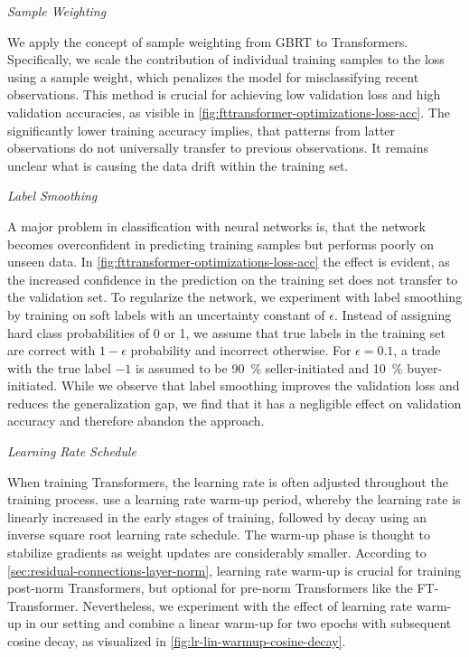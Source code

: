 \emph{Sample Weighting}

We apply the concept of sample weighting from \gls{GBRT} to Transformers. Specifically, we scale the contribution of individual training samples to the loss using a sample weight, which penalizes the model for misclassifying recent observations. This method is crucial for achieving low validation loss and high validation accuracies, as visible in \cref{fig:fttransformer-optimizations-loss-acc}. The significantly lower training accuracy implies, that patterns from latter observations do not universally transfer to previous observations. It remains unclear what is causing the data drift within the training set.

\clearpage

\emph{Label Smoothing}

A major problem in classification with neural networks is, that the network becomes overconfident in predicting training samples but performs poorly on unseen data. In \cref{fig:fttransformer-optimizations-loss-acc} the effect is evident, as the increased confidence in the prediction on the training set does not transfer to the validation set. To regularize the network, we experiment with label smoothing \autocite[][2823]{szegedyRethinkingInceptionArchitecture2016} by training on soft labels with an uncertainty constant of $\epsilon$. Instead of assigning hard class probabilities of 0 or 1, we assume that true labels in the training set are correct with $1-\epsilon$ probability and incorrect otherwise. For $\epsilon=\num{0.1}$, a trade with the true label $-1$ is assumed to be \SI{90}{\percent} seller-initiated and \SI{10}{\percent} buyer-initiated. While we observe that label smoothing improves the validation loss and reduces the generalization gap, we find that it has a negligible effect on validation accuracy and therefore abandon the approach.

\emph{Learning Rate Schedule}

When training Transformers, the learning rate is often adjusted throughout the training process. \textcite[][6007]{vaswaniAttentionAllYou2017} use a learning rate warm-up period, whereby the learning rate is linearly increased in the early stages of training, followed by decay using an inverse square root learning rate schedule. The warm-up phase is thought to stabilize gradients as weight updates are considerably smaller. According to \cref{sec:residual-connections-layer-norm}, learning rate warm-up is crucial for training post-norm Transformers, but optional for pre-norm Transformers like the FT-Transformer. Nevertheless, we experiment with the effect of learning rate warm-up in our setting and combine a linear warm-up for two epochs with subsequent cosine decay, as visualized in \cref{fig:lr-lin-warmup-cosine-decay}.

